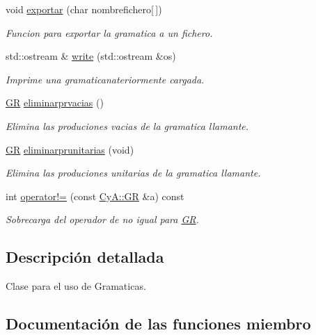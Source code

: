 \begin{DoxyCompactItemize}
void \mbox{\hyperlink{class_cy_a_1_1_g_r_a23ae98bf2b0df0b588bc84d7d645891f}{exportar}} (char nombrefichero\mbox{[}$\,$\mbox{]})
\begin{DoxyCompactList}\small\item\em Funcion para exportar la gramatica a un fichero. \end{DoxyCompactList}\item 
std\+::ostream \& \mbox{\hyperlink{class_cy_a_1_1_g_r_aedf100a8dd8e64f68142e505e5bc75cf}{write}} (std\+::ostream \&os)
\begin{DoxyCompactList}\small\item\em Imprime una gramaticanateriormente cargada. \end{DoxyCompactList}\item 
\mbox{\hyperlink{class_cy_a_1_1_g_r}{GR}} \mbox{\hyperlink{class_cy_a_1_1_g_r_acb16878bc707d77126a28f92a2355619}{eliminarprvacias}} ()
\begin{DoxyCompactList}\small\item\em Elimina las produciones vacias de la gramatica llamante. \end{DoxyCompactList}\item 
\mbox{\hyperlink{class_cy_a_1_1_g_r}{GR}} \mbox{\hyperlink{class_cy_a_1_1_g_r_ab13f68d53117a520efdb802e6ab3b99a}{eliminarprunitarias}} (void)
\begin{DoxyCompactList}\small\item\em Elimina las produciones unitarias de la gramatica llamante. \end{DoxyCompactList}\item 
int \mbox{\hyperlink{class_cy_a_1_1_g_r_abed49d1b06c6007e69c2afc55c931ada}{operator!=}} (const \mbox{\hyperlink{class_cy_a_1_1_g_r}{Cy\+A\+::\+GR}} \&a) const
\begin{DoxyCompactList}\small\item\em Sobrecarga del operador de no igual para \mbox{\hyperlink{class_cy_a_1_1_g_r}{GR}}. \end{DoxyCompactList}\end{DoxyCompactItemize}


\subsection{Descripción detallada}
Clase para el uso de Gramaticas. 

\subsection{Documentación de las funciones miembro}
\mbox{\label{class_cy_a_1_1_g_r_ae69828146c07258ec79c26fcc85b78f6}} 
